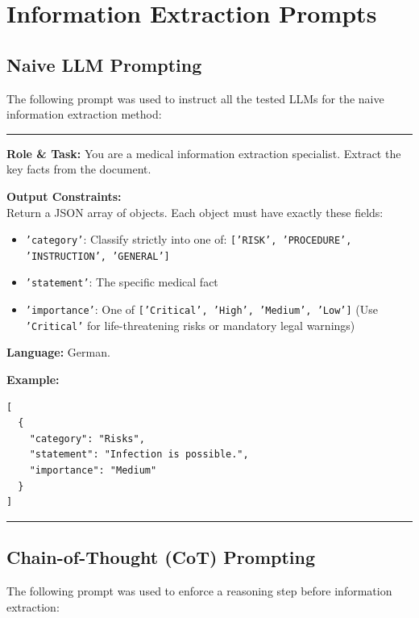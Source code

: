 \chapter{Information Extraction Prompts}

\section{Naive LLM Prompting}
\label{app:naive_extraction_prompt}

The following prompt was used to instruct all the tested LLMs for the naive information extraction method:

\vspace{0.5em}
\hrule
\vspace{0.5em}

\textbf{Role \& Task:} You are a medical information extraction specialist. Extract the key facts from the document.

\textbf{Output Constraints:}\\
Return a JSON array of objects. Each object must have exactly these fields:
\begin{itemize}
    \item \texttt{'category'}: Classify strictly into one of: \texttt{['RISK', 'PROCEDURE', 'INSTRUCTION', 'GENERAL']}
    \item \texttt{'statement'}: The specific medical fact
    \item \texttt{'importance'}: One of \texttt{['Critical', 'High', 'Medium', 'Low']} (Use \texttt{'Critical'} for life-threatening risks or mandatory legal warnings)
\end{itemize}
\textbf{Language:} German.

\textbf{Example:}
\begin{Verbatim}[fontsize=\small,breaklines=true,breakanywhere=true]
[
  {
    "category": "Risks", 
    "statement": "Infection is possible.", 
    "importance": "Medium"
  }
]
\end{Verbatim}

\vspace{0.5em}
\hrule
\vspace{0.5em}


\section{Chain-of-Thought (CoT) Prompting}
\label{app:cot_extraction_prompt}

The following prompt was used to enforce a reasoning step before information extraction:


